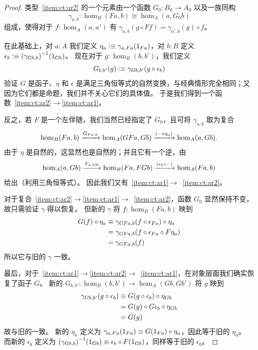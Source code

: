 \begin{proof}
  类型~\ref{item:ct:ar2} 的一个元素由一个函数 $G_0:B_0 \to A_0$ 以及一族同构
  \[ \gamma_{a,b}:\hom_B(Fa,b) \cong \hom_A(a,G_0 b) \]
  组成，使得对于 $f:\hom_{A}(a,a')$ 有 $\gamma_{a,b}(g \circ Ff) = \gamma_{a',b}(g)\circ f$。

  在此基础上，对 $a:A$ 我们定义 $\eta_a \vcentcolon\equiv \gamma_{a,Fa}(1_{Fa})$，对 $b:B$ 定义 $\epsilon_b \vcentcolon\equiv {(\gamma_{Gb,b})}^{-1}(1_{Gb})$。
  现在对于 $g:\hom_B(b,b')$，我们定义
  \[ G_{b,b'}(g) \vcentcolon\equiv \gamma_{G b, b'}(g \circ \epsilon_b) \]
  验证 $G$ 是函子、$\eta$ 和 $\epsilon$ 是满足三角恒等式的自然变换，与经典情形完全相同；又因为它们都是命题，我们并不关心它们的具体值。
  于是我们得到一个函数~\ref{item:ct:ar2}$\to$\ref{item:ct:ar1}。

  反之，若 $F$ 是一个左伴随，我们当然已经指定了 $G_0$，且可将 $\gamma_{a,b}$ 取为复合
  \[ \hom_B(Fa,b)
  \xrightarrow{G_{Fa,b}} \hom_A(GFa,Gb)
  \xrightarrow{(\mathord{\hspace{1pt}\text{--}\hspace{1pt}}\circ \eta_a)} \hom_A(a,Gb).
  \]
  由于 $\eta$ 是自然的，这显然也是自然的；并且它有一个逆，由
  \[ \hom_A(a,Gb)
  \xrightarrow{F_{a,Gb}} \hom_B(Fa,FGb)
  \xrightarrow{(\epsilon_b \circ \mathord{\hspace{1pt}\text{--}\hspace{1pt}} )} \hom_A(Fa,b)
  \]
  给出（利用三角恒等式）。
  因此我们又有~\ref{item:ct:ar1}$\to$~\ref{item:ct:ar2}。

  对于复合~\ref{item:ct:ar2}$\to$\ref{item:ct:ar1}$\to$~\ref{item:ct:ar2}，函数 $G_0$ 显然保持不变，故只需验证 $\gamma$ 得以恢复。
  但新的 $\gamma$ 将 $f:\hom_B(Fa,b)$ 映到
  \begin{align*}
    G(f) \circ \eta_a
    &\equiv \gamma_{G Fa, b}(f \circ \epsilon_{Fa}) \circ \eta_a\\
    &= \gamma_{G Fa, b}(f \circ \epsilon_{Fa} \circ F\eta_a)\\
    &= \gamma_{G Fa, b}(f)
  \end{align*}
  所以它与旧的 $\gamma$ 一致。

  最后，对于~\ref{item:ct:ar1}$\to$\ref{item:ct:ar2}$\to$~\ref{item:ct:ar1}，在对象层面我们确实恢复了函子 $G$。
  新的 $G_{b,b'}:\hom_B(b,b') \to \hom_A(Gb,Gb')$ 将 $g$ 映到
  \begin{align*}
    \gamma_{G b, b'}(g \circ \epsilon_b)
    &\equiv G(g \circ \epsilon_b) \circ \eta_{Gb}\\
    &= G(g) \circ G\epsilon_b \circ \eta_{Gb}\\
    &= G(g)
  \end{align*}
  故与旧的一致。
  新的 $\eta_a$ 定义为 $\gamma_{a,Fa}(1_{Fa}) \equiv G(1_{Fa}) \circ \eta_a$，因此等于旧的 $\eta_a$。
  而新的 $\epsilon_b$ 定义为 ${(\gamma_{Gb,b})}^{-1}(1_{Gb}) \equiv \epsilon_b \circ F(1_{Gb})$，同样等于旧的 $\epsilon_b$。
\end{proof}

